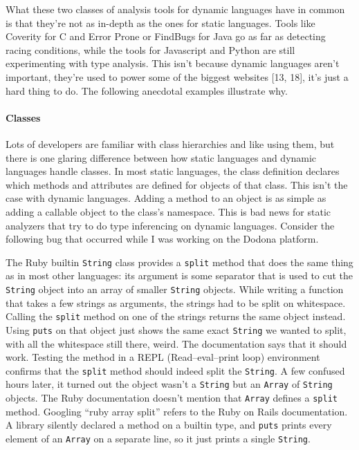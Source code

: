 \documentclass[a4paper, 16pt, oneside]{Thesis}
\let\oldparagraph\paragraph
\renewcommand{\paragraph}[1]{\oldparagraph{#1}\mbox{}}
\begin{document}
What these two classes of analysis tools for dynamic languages have in
common is that they're not as in-depth as the ones for static languages.
Tools like Coverity for C and Error Prone or FindBugs for Java go as far
as detecting racing conditions, while the tools for Javascript and
Python are still experimenting with type analysis. This isn't because
dynamic languages aren't important, they're used to power some of the
biggest websites {[}13, 18{]}, it's just a hard thing to do. The
following anecdotal examples illustrate why.

\clearpage

\paragraph{Classes}\label{classes}

Lots of developers are familiar with class hierarchies and like using
them, but there is one glaring difference between how static languages
and dynamic languages handle classes. In most static languages, the
class definition declares which methods and attributes are defined for
objects of that class. This isn't the case with dynamic languages.
Adding a method to an object is as simple as adding a callable object to
the class's namespace. This is bad news for static analyzers that try to
do type inferencing on dynamic languages. Consider the following bug
that occurred while I was working on the Dodona platform.

The Ruby builtin \texttt{String} class provides a \texttt{split} method
that does the same thing as in most other languages: its argument is
some separator that is used to cut the \texttt{String} object into an
array of smaller \texttt{String} objects. While writing a function that
takes a few strings as arguments, the strings had to be split on
whitespace. Calling the \texttt{split} method on one of the strings
returns the same object instead. Using \texttt{puts} on that object just
shows the same exact \texttt{String} we wanted to split, with all the
whitespace still there, weird. The documentation says that it should
work. Testing the method in a REPL (Read--eval--print loop) environment
confirms that the \texttt{split} method should indeed split the
\texttt{String}. A few confused hours later, it turned out the object
wasn't a \texttt{String} but an \texttt{Array} of \texttt{String}
objects. The Ruby documentation doesn't mention that \texttt{Array}
defines a \texttt{split} method. Googling ``ruby array split'' refers to
the Ruby on Rails documentation. A library silently declared a method on
a builtin type, and \texttt{puts} prints every element of an
\texttt{Array} on a separate line, so it just prints a single
\texttt{String}.
\end{document}
